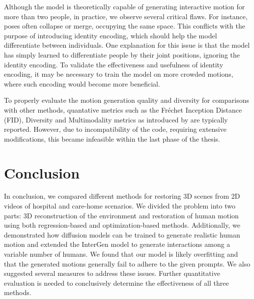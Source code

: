 Although the model is theoretically capable of generating interactive motion for more than two people, in practice, we observe several critical flaws. For instance, poses often collapse or merge, occupying the same space. This conflicts with the purpose of introducing identity encoding, which should help the model differentiate between individuals. One explanation for this issue is that the model has simply learned to differentiate people by their joint positions, ignoring the identity encoding. To validate the effectiveness and usefulness of identity encoding, it may be necessary to train the model on more crowded motions, where such encoding would become more beneficial.

To properly evaluate the motion generation quality and diversity for comparisons with other methods, quantative metrics such as the Fréchet Inception Distance (FID), Diversity and Multimodality metrics as introduced by \cite{Guo_2020} are typically reported. However, due to incompatibility of the code, requiring extensive modifications, this became infeasible within the last phase of the thesis.


\chapter{Conclusion}
In conclusion, we compared different methods for restoring 3D scenes from 2D videos of hospital and care-home scenarios. We divided the problem into two parts: 3D reconstruction of the environment and restoration of human motion using both regression-based and optimization-based methods. Additionally, we demonstrated how diffusion models can be trained to generate realistic human motion and extended the InterGen model to generate interactions among a variable number of humans. We found that our model is likely overfitting and that the generated motions generally fail to adhere to the given prompts. We also suggested several measures to address these issues. Further quantitative evaluation is needed to conclusively determine the effectiveness of all three methods. 